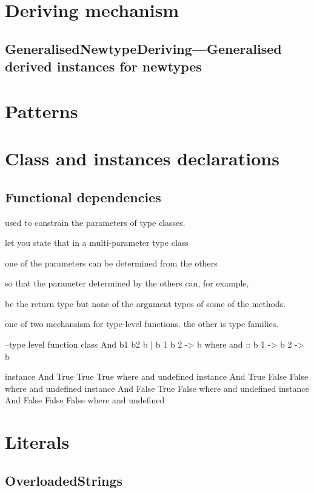\documentclass[openany, 12pt]{book}
\begin{document}
\part{Deriving mechanism}
\setcounter{chapter}{5}
\chapter{GeneralisedNewtypeDeriving---Generalised derived instances for newtypes}

\part{Patterns}
\part{Class and instances declarations}

\setcounter{chapter}{6}
\chapter{Functional dependencies}
\begin{alist}
	\item used to constrain the parameters of type classes.
	\item let you state that in a multi-parameter type class
	\item one of the parameters can be determined from the others
	\item so that the parameter determined by the others can, for example,
	\item be the return type but none of the argument types of some of the methods.
	\item one of two mechansism for type-level functions. the other is type
	families.
\end{alist}

\begin{haskell}{}
--type level function
class And b1 b2 b | b 1 b 2 -> b where
    and :: b 1 -> b 2 -> b

instance And True True True    where and undefined
instance And True False False  where and undefined
instance And False True False  where and undefined
instance And False False False where and undefined
\end{haskell}

\part{Literals}
\chapter{OverloadedStrings}
\end{document}
